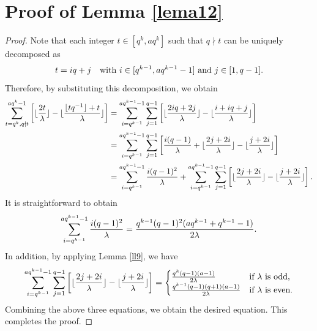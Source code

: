\documentclass[journal,onecolumn]{IEEEtran}
\begin{document}
\section{Proof of Lemma \ref{lema12}}
\begin{proof}
Note that 
each  integer $t\in \left[q^k,aq^{k}\right]$ such that $q\nmid t$ can be uniquely decomposed as \begin{equation*}  
t=iq+j \quad \hbox{with } i\in [q^{k-1}, aq^{k-1}-1] \hbox{ and }j\in [1,q-1].\end{equation*}
Therefore, by substituting this decomposition,  we obtain 
 \begin{equation}\notag
 \begin{split}
     \sum\limits_{t=q^{k},q\nmid t}^{aq^{k}-1}\left[\lfloor \frac{2t}{\lambda}\rfloor -\lfloor \frac{\lfloor tq^{-1}\rfloor+t}{\lambda}\rfloor\right] &= \sum\limits_{i=q^{k-1}}^{aq^{k-1}-1}\sum\limits_{j=1}^{q-1} \left[\lfloor \frac{2iq+2j}{\lambda}\rfloor -\lfloor \frac{i+iq+j}{\lambda}\rfloor\right]\\
     &= \sum\limits_{i=q^{k-1}}^{aq^{k-1}-1}\sum\limits_{j=1}^{q-1} \left[\frac{i(q-1)}{\lambda}+\lfloor \frac{2j+2i}{\lambda}\rfloor -\lfloor \frac{j+2i}{\lambda}\rfloor \right]\\ 
     &= \sum\limits_{i=q^{k-1}}^{aq^{k-1}-1}\frac{i(q-1)^2}{\lambda}+\sum\limits_{i=q^{k-1}}^{aq^{k-1}-1}\sum\limits_{j=1}^{q-1}\left[\lfloor \frac{2j+2i}{\lambda}\rfloor-\lfloor\frac{j+2i}{\lambda} \rfloor\right].
 \end{split}
\end{equation} 
It is straightforward to obtain 
\begin{equation}\notag
    \sum\limits_{i=q^{k-1}}^{aq^{k-1}-1}\frac{i(q-1)^2}{\lambda} = \frac{q^{k-1}(q-1)^2(aq^{k-1}+q^{k-1}-1)}{2\lambda}.
\end{equation}
In addition, by applying Lemma \ref{ll9}, we have 
\begin{equation}\notag
   \sum\limits_{i=q^{k-1}}^{aq^{k-1}-1}\sum\limits_{j=1}^{q-1}\left[\lfloor \frac{2j+2i}{\lambda}\rfloor-\lfloor\frac{j+2i}{\lambda} \rfloor\right]=\begin{cases}
       \frac{q^k(q-1)(a-1)}{2\lambda}& \hbox{if }\lambda \hbox{ is odd,} \\
        \frac{q^{k-1}(q-1)(q+1)(a-1)}{2\lambda}& \hbox{if }\lambda \hbox{ is even.} 
   \end{cases}
\end{equation}  
Combining the above three equations, we obtain the desired equation. This completes the proof. 
\end{proof}
\end{document}
